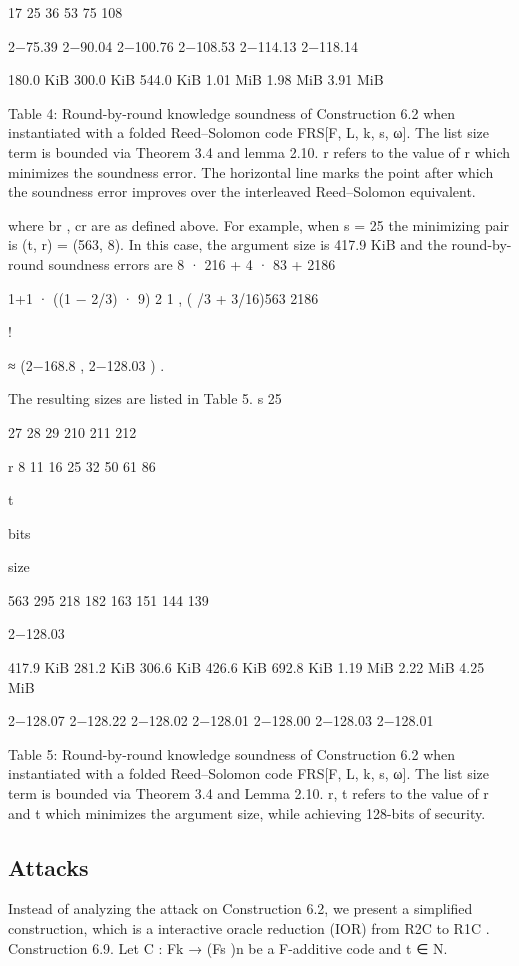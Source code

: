 \documentclass[11pt]{article}
\begin{document}
17
25
36
53
75
108

2−75.39
2−90.04
2−100.76
2−108.53
2−114.13
2−118.14

180.0 KiB
300.0 KiB
544.0 KiB
1.01 MiB
1.98 MiB
3.91 MiB

Table 4: Round-by-round knowledge soundness of Construction 6.2 when instantiated with a folded
Reed–Solomon code FRS[F, L, k, s, ω]. The list size term is bounded via Theorem 3.4 and lemma 2.10.
r refers to the value of r which minimizes the soundness error. The horizontal line marks the point
after which the soundness error improves over the interleaved Reed–Solomon equivalent.

where br , cr are as defined above.
For example, when s = 25 the minimizing pair is (t, r) = (563, 8). In this case, the argument
size is 417.9 KiB and the round-by-round soundness errors are
8 · 216 + 4 · 83
+
2186

1+1
· ((1 − 2/3) · 9) 2
1
, ( /3 + 3/16)563
2186

!

≈ (2−168.8 , 2−128.03 ) .

The resulting sizes are listed in Table 5.
s
25


27
28
29
210
211
212

r
8
11
16
25
32
50
61
86

t

bits

size

563
295
218
182
163
151
144
139

2−128.03

417.9 KiB
281.2 KiB
306.6 KiB
426.6 KiB
692.8 KiB
1.19 MiB
2.22 MiB
4.25 MiB

2−128.07
2−128.22
2−128.02
2−128.01
2−128.00
2−128.03
2−128.01

Table 5: Round-by-round knowledge soundness of Construction 6.2 when instantiated with a folded
Reed–Solomon code FRS[F, L, k, s, ω]. The list size term is bounded via Theorem 3.4 and Lemma 2.10.
r, t refers to the value of r and t which minimizes the argument size, while achieving 128-bits of security.


\subsection{Attacks}



Instead of analyzing the attack on Construction 6.2, we present a simplified construction, which is
a interactive oracle reduction (IOR) from R2C to R1C .
Construction 6.9. Let C : Fk → (Fs )n be a F-additive code and t ∈ N.
\end{document}

